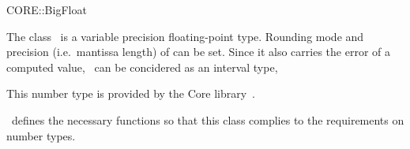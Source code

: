 \ccDefGlobalScope{}
\begin{ccRefClass}{CORE::BigFloat}

\ccDefinition

The class \ccRefName\ is a variable precision floating-point type. 
Rounding mode and precision (i.e.\ mantissa length) of 
 can be set. 
Since it also carries the error of a computed value, 
\ccRefName\ can be concidered as an interval type,  

This number type is provided by the {\sc Core} library~\cite{klpy-clp-99}.

\cgal\ defines the necessary functions so that this class complies to the
requirements on number types.


\ccIsModel
{}\\
\\

\end{ccRefClass}
